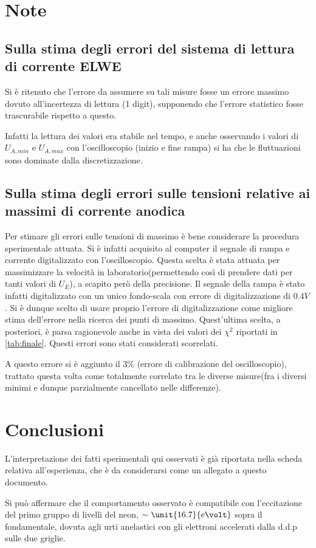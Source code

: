 \documentclass[10pt,a4paper]{article}
\begin{document}
\section{Note}

\subsection{Sulla stima degli errori del sistema di lettura di corrente ELWE}
\label{errELWE}
Si è ritenuto che l'errore da assumere su tali misure fosse un errore massimo dovuto all'incertezza di lettura (1 digit), supponendo che l'errore statistico fosse trascurabile rispetto a questo.

Infatti la lettura dei valori era stabile nel tempo, e anche osservando i valori di $U_{A, min}$ e $U_{A, max}$ con l'oscilloscopio (inizio e fine rampa) si ha che le fluttuazioni sono dominate dalla discretizzazione.

\subsection{Sulla stima degli errori sulle tensioni relative ai massimi di corrente anodica}

Per stimare gli errori sulle tensioni di massimo è bene considerare la procedura sperimentale attuata. Si è infatti acquisito al computer il segnale di rampa e corrente digitalizzato con l'oscilloscopio. Questa scelta è stata attuata per massimizzare la velocità in laboratorio(permettendo così di prendere dati per tanti valori di $U_E$), a scapito però della precisione. Il segnale della rampa è stato infatti digitalizzato con un unico fondo-scala con errore di digitalizzazione   di $0.4 V$. Si è dunque scelto di usare proprio l'errore di digitalizzazione come migliore stima dell'errore nella ricerca dei punti di massimo.  Quest'ultima scelta, a posteriori, è parsa ragionevole anche in vista dei valori dei $\chi^2$ riportati in \ref{tab:finale}. Questi errori sono stati considerati scorrelati.

A questo errore si è aggiunto il 3\% (errore di calibrazione del oscilloscopio), trattato questa volta come totalmente correlato tra le diverse misure(fra i diversi minimi e dunque parzialmente cancellato nelle differenze).

\section{Conclusioni}
L'interpretazione dei fatti sperimentali qui osservati è già riportata nella scheda relativa all'esperienza, che è da considerarsi come un allegato a questo documento.

Si può affermare che il comportamento osservato è compatibile con l'eccitazione del primo gruppo di livelli del neon, $\sim \unit{16.7}{e\volt}$ sopra il fondamentale, dovuta agli urti anelastici con gli elettroni accelerati dalla d.d.p sulle due griglie.
\end{document}
